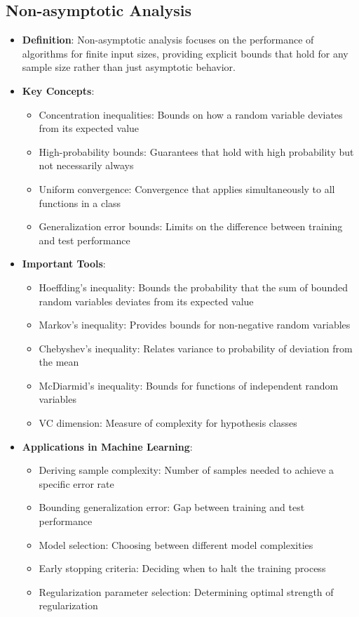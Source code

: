\documentclass{article}
\begin{document}
\subsection{Non-asymptotic Analysis}
\begin{itemize}
    \item \textbf{Definition}: Non-asymptotic analysis focuses on the performance of algorithms for finite input sizes, providing explicit bounds that hold for any sample size rather than just asymptotic behavior.
    
    \item \textbf{Key Concepts}:
    \begin{itemize}
        \item Concentration inequalities: Bounds on how a random variable deviates from its expected value
        \item High-probability bounds: Guarantees that hold with high probability but not necessarily always
        \item Uniform convergence: Convergence that applies simultaneously to all functions in a class
        \item Generalization error bounds: Limits on the difference between training and test performance
    \end{itemize}
    
    \item \textbf{Important Tools}:
    \begin{itemize}
        \item Hoeffding's inequality: Bounds the probability that the sum of bounded random variables deviates from its expected value
        \item Markov's inequality: Provides bounds for non-negative random variables
        \item Chebyshev's inequality: Relates variance to probability of deviation from the mean
        \item McDiarmid's inequality: Bounds for functions of independent random variables
        \item VC dimension: Measure of complexity for hypothesis classes
    \end{itemize}
    
    \item \textbf{Applications in Machine Learning}:
    \begin{itemize}
        \item Deriving sample complexity: Number of samples needed to achieve a specific error rate
        \item Bounding generalization error: Gap between training and test performance
        \item Model selection: Choosing between different model complexities
        \item Early stopping criteria: Deciding when to halt the training process
        \item Regularization parameter selection: Determining optimal strength of regularization
    \end{itemize}
    

\end{itemize}
\end{document}
